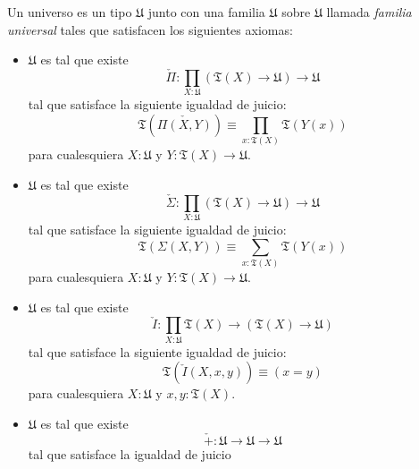 \documentclass{article}
\begin{document}
        \begin{definition}[Universo]
            Un universo es un tipo $\mathfrak{U}$ junto con una familia
            $\mathfrak{U}$ sobre $\mathfrak{U}$ llamada 
            \textit{familia universal} tales que satisfacen los siguientes
            axiomas:

            \begin{itemize}
                \item $\mathfrak{U}$ es tal que existe 
                $$
                \check{\Pi} : \prod_{X : \mathfrak{U}} 
                    (\mathfrak{T}(X) \rightarrow \mathfrak{U}) 
                        \rightarrow \mathfrak{U}
                $$
                tal que satisface la siguiente igualdad de juicio:
                $$
                    \mathfrak{T}(\check{\Pi(X,Y)}) \equiv 
                        \prod_{x : \mathfrak{T}(X)} \mathfrak{T}(Y(x))
                $$
                para cualesquiera $X : \mathfrak{U}$ y 
                    $Y : \mathfrak{T}(X) \rightarrow \mathfrak{U}$.
                \item $\mathfrak{U}$ es tal que existe
                $$
                \check{\Sigma} : \prod_{X : \mathfrak{U}} 
                    (\mathfrak{T}(X) \rightarrow \mathfrak{U}) 
                        \rightarrow \mathfrak{U}
                $$
                tal que satisface la siguiente igualdad de juicio:
                $$
                    \mathfrak{T}(\Sigma(X,Y)) \equiv 
                        \sum\limits_{x : \mathfrak{T}(X)}\mathfrak{T}(Y(x))
                $$
                para cualesquiera $X : \mathfrak{U}$ y 
                $Y : \mathfrak{T}(X) \rightarrow \mathfrak{U}$.
                \item $\mathfrak{U}$ es tal que existe
                $$
                    \check{I} : \prod_{X : \mathfrak{U}} \mathfrak{T}(X)  
                        \rightarrow (\mathfrak{T}(X) \rightarrow \mathfrak{U})
                $$
                tal que satisface la siguiente igualdad de juicio:
                $$
                    \mathfrak{T}(\check{I}(X, x, y)) \equiv (x = y)
                $$
                para cualesquiera $X : \mathfrak{U}$ y $x,y : \mathfrak{T}(X)$.
                \item $\mathfrak{U}$ es tal que existe 
                $$
                    \check{+}:\mathfrak{U} \rightarrow \mathfrak{U} 
                        \rightarrow \mathfrak{U}
                $$
                tal que satisface la igualdad de juicio
                $$
$$
\end{itemize}
\end{definition}
\end{document}
